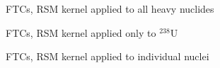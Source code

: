 \documentclass[sans,mathserif,aspectratio=169]{beamer}
\begin{document}
\begin{frame}{FTCs, RSM kernel applied to all heavy nuclides}
\centering
{}
\end{frame}

\begin{frame}{FTCs, RSM kernel applied only to $^{238}$U}
\centering
{}
\end{frame}

\begin{frame}{FTCs, RSM kernel applied to individual nuclei}
\centering
{}
\end{frame}
\end{document}

